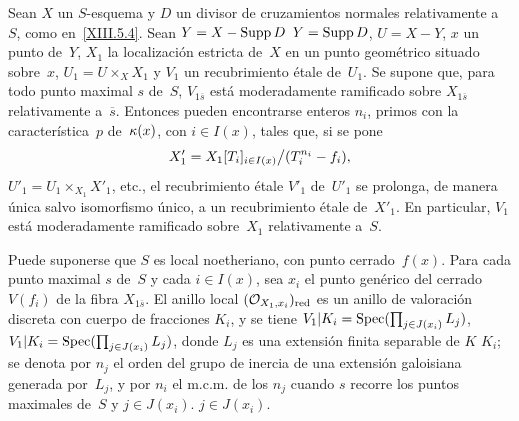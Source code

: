 
\begin{proposition}
\label{XIII.5.5}
%
Sean $X$ un $S$-esquema y $D$ un divisor de cruzamientos normales
relativamente a~$S$, como en~\eqref{XIII.5.4}. Sean
{$Y=X-\operatorname{Supp} D$}
{$Y=\operatorname{Supp} D$},
$U=X-Y$, $x$ un punto de~$Y$, $X_{1}$ la localización estricta de~$X$
en un punto geométrico situado sobre~$x$, $U_{1}=U\times_{X}X_{1}$ y
$V_{1}$ un recubrimiento étale de~$U_{1}$. Se supone que, para todo
punto maximal $s$ de~$S$, $V_{1\overline{s}}$ está moderadamente
ramificado sobre $X_{1\overline{s}}$ relativamente a~$\overline{s}$.
Entonces pueden encontrarse enteros $n_{i}$, primos con la
característica~$p$ de~$\kappa(x)$, con
$i\in I(x)$, tales que, si se pone
$$
X'_{1}=X_{1}[T_{i}]_{i\in I(x)}\big/(T_{i}^{n_{i}}-f_{i}),
$$
$U'_{1}=U_{1}\times_{X_{1}}X'_{1}$, etc., el recubrimiento étale
$V'_{1}$ de~$U'_{1}$ se prolonga, de manera única salvo isomorfismo
único, a un recubrimiento étale de~$X'_{1}$. En particular,
$V_{1}$ está moderadamente ramificado sobre~$X_{1}$ relativamente a~$S$.
\end{proposition}

Puede suponerse que $S$ es local noetheriano, con punto cerrado~$f(x)$.
Para cada punto maximal $s$ de~$S$ y cada $i\in I(x)$, sea $x_{i}$ el
punto genérico del cerrado $V(f_{i})$ de la fibra $X_{1\overline{s}}$.
El anillo local $(\mathcal{O}_{X_{1},x_{i}})_{\mathrm{red}}$ es un anillo de
valoración discreta con cuerpo de fracciones $K_{i}$, y se tiene
{$V_{1}|K_{i}=\operatorname{Spec}(\prod_{j\in J(x_{i})}L_{j})$,}
{$V_{1}|K_{i}=\operatorname{Spec}(\prod_{j\in J(x_{i})}L_{j})$,}
donde $L_{j}$ es una extensión finita separable de
{$K$}
{$K_{i}$};
se denota por $n_{j}$ el orden del grupo de inercia de una extensión
galoisiana generada por~$L_{j}$, y por $n_{i}$ el m.c.m. de los $n_{j}$
cuando $s$ recorre los puntos maximales de~$S$ y
{$j\in J(x_{i})$.}
{$j\in J(x_{i})$.}

